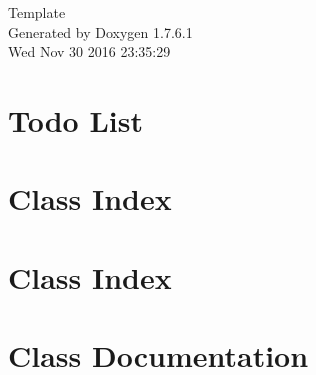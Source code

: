 \documentclass[a4paper]{book}
\begin{document}
\hypersetup{pageanchor=false,citecolor=blue}
\begin{titlepage}
\vspace*{7cm}
\begin{center}
{\Large \-Template }\\
\vspace*{1cm}
{\large \-Generated by Doxygen 1.7.6.1}\\
\vspace*{0.5cm}
{\small Wed Nov 30 2016 23:35:29}\\
\end{center}
\end{titlepage}
\clearemptydoublepage
{}
\tableofcontents
\clearemptydoublepage
{}
\hypersetup{pageanchor=true,citecolor=blue}
\chapter{\-Todo \-List}
\label{todo}
\hypertarget{todo}{}

\chapter{\-Class \-Index}

\chapter{\-Class \-Index}

\chapter{\-Class \-Documentation}




























\printindex
\end{document}
